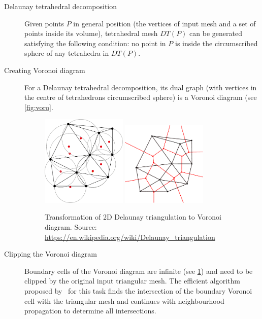 \begin{description}
    \item[Delaunay tetrahedral decomposition] Given points $P$ in general position (the vertices of input mesh and a set of points inside its volume), tetrahedral mesh $DT(P)$ can be generated satisfying the following condition: no point in $P$ is inside the circumscribed sphere of any tetrahedra in $DT(P)$.
    \item[Creating Voronoi diagram] For a Delaunay tetrahedral decomposition, its dual graph (with vertices in the centre of tetrahedrons circumscribed sphere) is a Voronoi diagram (see \cref{fig:voro}.
    
 \begin{figure}
    \centering
    \includegraphics[width=0.4\textwidth]{img/delaunay}
    \includegraphics[width=0.4\textwidth]{img/voronoi}
    \caption{Transformation of 2D Delaunay triangulation to Voronoi diagram. Source: \url{https://en.wikipedia.org/wiki/Delaunay\_triangulation}}
    \label{fig:DT}
\end{figure}

    \item[Clipping the Voronoi diagram] Boundary cells of the Voronoi diagram are infinite (see \cref{fig:DT}) and need to be clipped by the original input triangular mesh. The efficient algorithm proposed by~\citet{yan2010efficient} for this task finds the intersection of the boundary Voronoi cell with the triangular mesh and continues with neighbourhood propagation to determine all intersections. 
\end{description}

